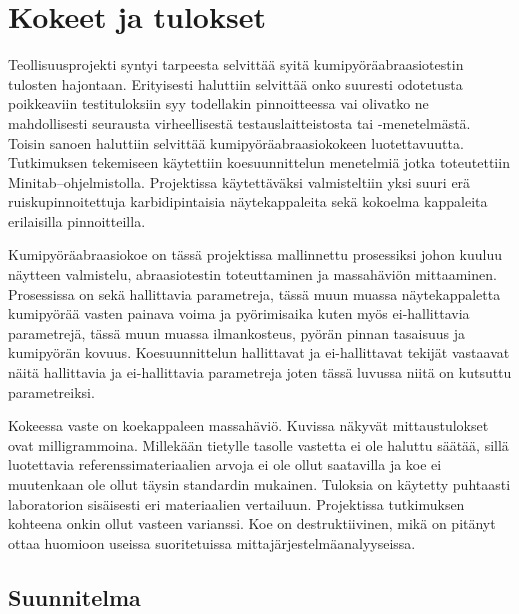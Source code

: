 \documentclass[12pt,a4paper,finnish]{tutthesis}
\begin{document}
\chapter{Kokeet ja tulokset}
\label{ch:kokeet}


Teollisuusprojekti syntyi tarpeesta selvittää syitä
kumipyöräabraasiotestin tulosten hajontaan. Erityisesti
haluttiin selvittää onko suuresti odotetusta poikkeaviin
testituloksiin syy todellakin pinnoitteessa vai olivatko
ne mahdollisesti seurausta virheellisestä testauslaitteistosta
tai -menetelmästä. Toisin sanoen haluttiin selvittää
kumipyöräabraasiokokeen luotettavuutta. Tutkimuksen tekemiseen
käytettiin koesuunnittelun menetelmiä jotka
toteutettiin Minitab–ohjelmistolla. Projektissa käytettäväksi
valmisteltiin yksi suuri erä ruiskupinnoitettuja karbidipintaisia näytekappaleita
sekä kokoelma kappaleita erilaisilla pinnoitteilla.

Kumipyöräabraasiokoe on tässä projektissa mallinnettu prosessiksi johon kuuluu
näytteen valmistelu, abraasiotestin toteuttaminen ja massahäviön
mittaaminen. Prosessissa on sekä hallittavia parametreja, tässä muun muassa
näytekappaletta kumipyörää vasten painava
voima ja pyörimisaika kuten myös ei-hallittavia parametrejä, tässä muun muassa
ilmankosteus, pyörän pinnan tasaisuus ja kumipyörän kovuus.
Koesuunnittelun hallittavat ja ei-hallittavat
tekijät vastaavat näitä hallittavia ja ei-hallittavia parametreja joten
tässä luvussa niitä on kutsuttu parametreiksi.

Kokeessa vaste on koekappaleen massahäviö.
Kuvissa näkyvät mittaustulokset ovat milligrammoina.
Millekään tietylle tasolle
vastetta ei ole haluttu säätää, sillä luotettavia referenssimateriaalien
arvoja ei ole ollut saatavilla ja koe ei muutenkaan ole ollut täysin
standardin mukainen. Tuloksia on käytetty puhtaasti laboratorion
sisäisesti eri materiaalien vertailuun. Projektissa tutkimuksen
kohteena onkin ollut vasteen varianssi. Koe on destruktiivinen,
mikä on pitänyt ottaa huomioon useissa suoritetuissa
mittajärjestelmäanalyyseissa.



\section{Suunnitelma}
\end{document}
